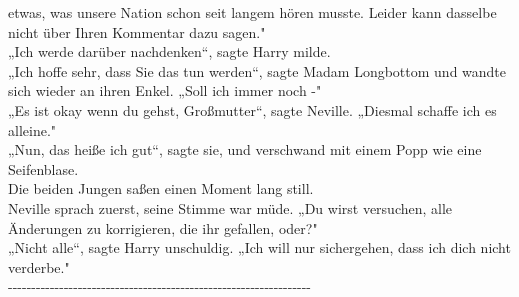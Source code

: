 {etwas, was unsere Nation schon seit langem hören musste. Leider kann dasselbe nicht über Ihren Kommentar dazu sagen."\\ „Ich werde darüber nachdenken“, sagte Harry milde.\\ „Ich hoffe sehr, dass Sie das tun werden“, sagte Madam Longbottom und wandte sich wieder an ihren Enkel. „Soll ich immer noch -"\\ „Es ist okay wenn du gehst, Großmutter“, sagte Neville. „Diesmal schaffe ich es alleine."\\ „Nun, das heiße ich gut“, sagte sie, und verschwand mit einem Popp wie eine Seifenblase.\\ Die beiden Jungen saßen einen Moment lang still.\\ Neville sprach zuerst, seine Stimme war müde. „Du wirst versuchen, alle Änderungen zu korrigieren, die ihr gefallen, oder?"\\ „Nicht alle“, sagte Harry unschuldig. „Ich will nur sichergehen, dass ich dich nicht verderbe."\\ -\/-\/-\/-\/-\/-\/-\/-\/-\/-\/-\/-\/-\/-\/-\/-\/-\/-\/-\/-\/-\/-\/-\/-\/-\/-\/-\/-\/-\/-\/-\/-\/-\/-\/-\/-\/-\/-\/-\/-\/-\/-\/-\/-\/-\/-\/-\/-\/-\/-\/-\/-\/-\/-\/-\/-\/-\/-\/-\/-\/-\/-\/-\/-\/-

}
